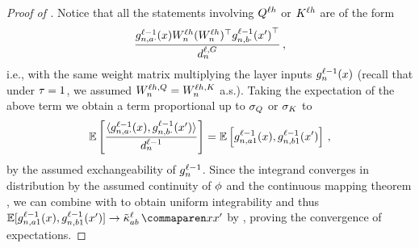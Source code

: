 \begin{proof}[Proof of ]
    Notice that all the statements involving $Q^{\ell h}$ or $K^{\ell h}$ are of the form
    \begin{align*}
        \frac{
            {g}^{\ell - 1}_{n, a \cdot}{(x)}
            W_{n}^{\ell h}
            (W_{n}^{\ell h})^\top
            {g}^{\ell - 1}_{n, b \cdot}{(x')}^\top
        }{
            d_{n}^{\ell, G}
        }
        \, ,
    \end{align*}
    i.e., with the same weight matrix multiplying the layer inputs $g_{n}^{\ell - 1}(x)$ (recall that under $\tau = 1$, we assumed $W_{n}^{\ell h, Q} = W_{n}^{\ell h, K}$ a.s.).
    Taking the expectation of the above term we obtain a term proportional up to $\sigma_{Q}$ or $\sigma_{K}$ to
    \begin{align*}
        \operatorname*{\mathbb{E}} \left[
            \frac{
                \langle {g}^{\ell - 1}_{n, a \cdot}{(x)} , {g}^{\ell - 1}_{n, b \cdot}{(x')} \rangle
            }{
                d_{n}^{\ell - 1}
            }
        \right]
        =
        \operatorname*{\mathbb{E}} \left[
            {g}^{\ell - 1}_{n, a 1}{(x)} , {g}^{\ell - 1}_{n, b 1}{(x')} 
        \right]
        \, ,
    \end{align*}
    by the assumed exchangeability of $g_{n}^{\ell - 1}$.
    Since the integrand converges in distribution by the assumed continuity of $\phi$ and the continuous mapping theorem \citep[theorem~9.3.7]{dudley02}, we can combine  with  to obtain uniform integrability and thus
    $
        \E [
            \indexedActivity{\depthSymbol - 1}{\sequenceVariable, a 1}{\inputSymbol} , \indexedActivity{\depthSymbol - 1}{\sequenceVariable, b 1}{\inputSymbol'} 
        ]
        \to
        \kerntildef{a b}{\depthSymbol}{\inputSymbol}{\inputSymbol'}
    $
    by , proving the convergence of expectations.
    

\end{proof}
